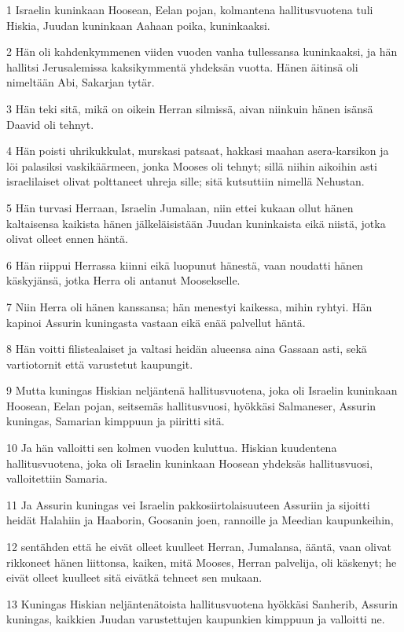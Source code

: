 \par 1 Israelin kuninkaan Hoosean, Eelan pojan, kolmantena hallitusvuotena tuli Hiskia, Juudan kuninkaan Aahaan poika, kuninkaaksi.
\par 2 Hän oli kahdenkymmenen viiden vuoden vanha tullessansa kuninkaaksi, ja hän hallitsi Jerusalemissa kaksikymmentä yhdeksän vuotta. Hänen äitinsä oli nimeltään Abi, Sakarjan tytär.
\par 3 Hän teki sitä, mikä on oikein Herran silmissä, aivan niinkuin hänen isänsä Daavid oli tehnyt.
\par 4 Hän poisti uhrikukkulat, murskasi patsaat, hakkasi maahan asera-karsikon ja löi palasiksi vaskikäärmeen, jonka Mooses oli tehnyt; sillä niihin aikoihin asti israelilaiset olivat polttaneet uhreja sille; sitä kutsuttiin nimellä Nehustan.
\par 5 Hän turvasi Herraan, Israelin Jumalaan, niin ettei kukaan ollut hänen kaltaisensa kaikista hänen jälkeläisistään Juudan kuninkaista eikä niistä, jotka olivat olleet ennen häntä.
\par 6 Hän riippui Herrassa kiinni eikä luopunut hänestä, vaan noudatti hänen käskyjänsä, jotka Herra oli antanut Moosekselle.
\par 7 Niin Herra oli hänen kanssansa; hän menestyi kaikessa, mihin ryhtyi. Hän kapinoi Assurin kuningasta vastaan eikä enää palvellut häntä.
\par 8 Hän voitti filistealaiset ja valtasi heidän alueensa aina Gassaan asti, sekä vartiotornit että varustetut kaupungit.
\par 9 Mutta kuningas Hiskian neljäntenä hallitusvuotena, joka oli Israelin kuninkaan Hoosean, Eelan pojan, seitsemäs hallitusvuosi, hyökkäsi Salmaneser, Assurin kuningas, Samarian kimppuun ja piiritti sitä.
\par 10 Ja hän valloitti sen kolmen vuoden kuluttua. Hiskian kuudentena hallitusvuotena, joka oli Israelin kuninkaan Hoosean yhdeksäs hallitusvuosi, valloitettiin Samaria.
\par 11 Ja Assurin kuningas vei Israelin pakkosiirtolaisuuteen Assuriin ja sijoitti heidät Halahiin ja Haaborin, Goosanin joen, rannoille ja Meedian kaupunkeihin,
\par 12 sentähden että he eivät olleet kuulleet Herran, Jumalansa, ääntä, vaan olivat rikkoneet hänen liittonsa, kaiken, mitä Mooses, Herran palvelija, oli käskenyt; he eivät olleet kuulleet sitä eivätkä tehneet sen mukaan.
\par 13 Kuningas Hiskian neljäntenätoista hallitusvuotena hyökkäsi Sanherib, Assurin kuningas, kaikkien Juudan varustettujen kaupunkien kimppuun ja valloitti ne.
